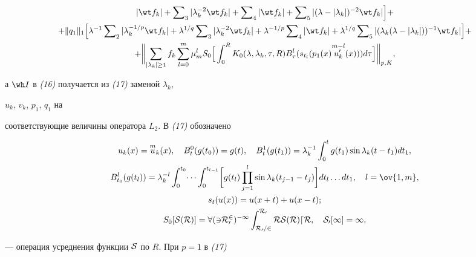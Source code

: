 {\begin{lem}
\begin{multline}
|\wt f_k| +\sumn_3 |\lambda^{-2}_k\wt f_k|+


\sumn_4 |\wt f_k| +\sumn_5 |(\lambda-|\lambda_k|)^{-2}\wt f_k|\Bigr] + \\


+\|q_1\|_1 \Bigl[\lambda^{-1} \sumn_2


|\lambda^{-1/p}_k \wt f_k|+\lambda^{1/q} \sumn_3


|\lambda^{-2}_k \wt f_k| +\lambda^{-1/p} \sumn_4|\wt f_k|+


\lambda^{1/q}\sumn_5|(\lambda_k(\lambda-|\lambda_k|))^{-1}


\wt f_k|\Bigr]+\\


+\biggl\|\sum_{|\lambda_k|\ge 1}f_k\sum^m_{l=0}\mu^l_m S_0


\Bigl [ \,\int^R_0 K_0(\lambda,\lambda_k,\tau,R)B^l_\tau


(s_{t_l}(p_1(x)\overset{m-l}{u'_k}{}(x)))d\tau\Bigr]\biggr\|_{p,K},


\end{multline}


а $\wh I$ в {\em (16)} получается из {\em (17)} заменой $\lambda_k$,


$u_k$, $v_k$, $p_1$, $q_1$ на


соответствующие величины оператора $L_2$. В {\em (17)} обозначено


\begin{gather*}


u_k(x)=\overset{m}{u}{}_k(x),\quad B^0_t(g(t_0))=g(t),\quad


B^1_t(g(t_1))=\lambda^{-1}_k\int^t_0 g(t_1)\sin\lambda_k


(t-t_1)dt_1,\\


B^l_{t_0}(g(t_l))=\lambda^{-l}_k


\int^{t_0}_0\dotsi\int^{t_{l-1}}_0\biggl[g(t_l)\prod^l_{j=1}


\sin\lambda_k(t_{j-1}-t_j)\biggr]dt_l\dotsc dt_1,\quad


l=\ov{1,m}, \\


s_t(u(x))=u(x+t)+u(x-t);\\


S_0[\cal S(R)]=8(3R^2_0)^{-1}


\int^{R_0}_{R_0/2}R\cal S(R)dR,\quad S_0[1]=1,


\end{gather*}


--- операция усреднения функции $\cal S$ по $R$. При $p=1$ в {\em (17)}



\end{lem}}
